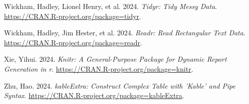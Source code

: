 \documentclass[
  letterpaper,
  DIV=11,
  numbers=noendperiod]{scrartcl}
\newlength{\cslhangindent}
\newenvironment{CSLReferences}[2] %
 {\begin{list}{}{%
  \setlength{\itemindent}{0pt}
  \setlength{\leftmargin}{0pt}
  \setlength{\parsep}{0pt}
  \ifodd #1
   \setlength{\leftmargin}{\cslhangindent}
   \setlength{\itemindent}{-1\cslhangindent}
  \fi
  \setlength{\itemsep}{#2\baselineskip}}}
 {\end{list}}
\begin{document}
\begin{CSLReferences}{1}{0}
Wickham, Hadley, Lionel Henry, et al. 2024. \emph{Tidyr: Tidy Messy
Data}. \url{https://CRAN.R-project.org/package=tidyr}.

Wickham, Hadley, Jim Hester, et al. 2024. \emph{Readr: Read Rectangular
Text Data}. \url{https://CRAN.R-project.org/package=readr}.

Xie, Yihui. 2024. \emph{Knitr: A General-Purpose Package for Dynamic
Report Generation in r}. \url{https://CRAN.R-project.org/package=knitr}.

Zhu, Hao. 2024. \emph{kableExtra: Construct Complex Table with 'Kable'
and Pipe Syntax}. \url{https://CRAN.R-project.org/package=kableExtra}.

\end{CSLReferences}
\end{document}
